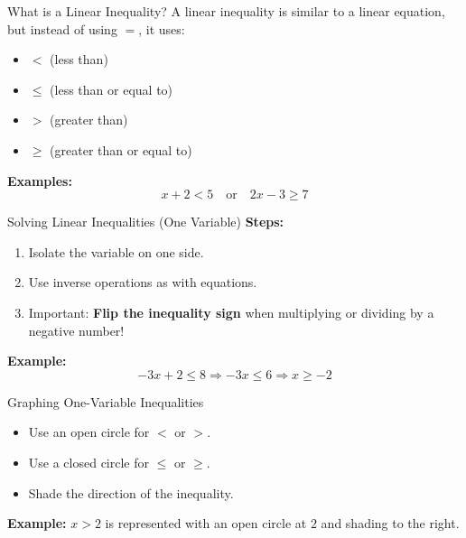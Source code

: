 \documentclass{beamer}
\begin{document}
\begin{frame}{What is a Linear Inequality?}
    A linear inequality is similar to a linear equation, but instead of using \(=\), it uses:
    \begin{itemize}
        \item \(<\) (less than)
        \item \(\le\) (less than or equal to)
        \item \(>\) (greater than)
        \item \(\ge\) (greater than or equal to)
    \end{itemize}

    \vspace{0.5cm}
    \textbf{Examples:}
    \[
    x + 2 < 5 \quad \text{or} \quad 2x - 3 \ge 7
    \]
\end{frame}

\begin{frame}{Solving Linear Inequalities (One Variable)}
    \textbf{Steps:}
    \begin{enumerate}
        \item Isolate the variable on one side.
        \item Use inverse operations as with equations.
        \item Important: \textbf{Flip the inequality sign} when multiplying or dividing by a negative number!
    \end{enumerate}

    \vspace{0.5cm}
    \textbf{Example:}
    \[
    -3x + 2 \le 8 \Rightarrow -3x \le 6 \Rightarrow x \ge -2
    \]
\end{frame}

\begin{frame}{Graphing One-Variable Inequalities}
    \begin{itemize}
        \item Use an open circle for \(<\) or \(>\).
        \item Use a closed circle for \(\le\) or \(\ge\).
        \item Shade the direction of the inequality.
    \end{itemize}

    \vspace{0.5cm}
    \textbf{Example:} \(x > 2\) is represented with an open circle at \(2\) and shading to the right.
\end{frame}
\end{document}

